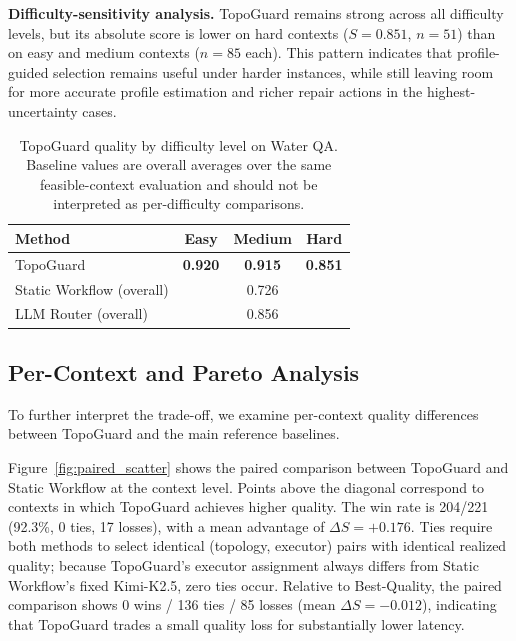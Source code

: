 \documentclass[acmsmall,review,anonymous]{acmart}
\begin{document}
\textbf{Difficulty-sensitivity analysis.} TopoGuard remains strong across all difficulty levels, but its absolute score is lower on hard contexts ($S=0.851$, $n=51$) than on easy and medium contexts ($n=85$ each). This pattern indicates that profile-guided selection remains useful under harder instances, while still leaving room for more accurate profile estimation and richer repair actions in the highest-uncertainty cases.

\begin{table}[t]
\centering
\caption{TopoGuard quality by difficulty level on Water QA. Baseline values are overall averages over the same feasible-context evaluation and should not be interpreted as per-difficulty comparisons.}
\label{tab:difficulty_breakdown}
\small
\begin{tabular}{lccc}
\toprule
\textbf{Method} & \textbf{Easy} & \textbf{Medium} & \textbf{Hard} \\
\midrule
TopoGuard        & \textbf{0.920} & \textbf{0.915} & \textbf{0.851} \\
Static Workflow (overall) & \multicolumn{3}{c}{0.726} \\
LLM Router (overall)       & \multicolumn{3}{c}{0.856} \\
\bottomrule
\end{tabular}
\end{table}



\subsection{Per-Context and Pareto Analysis}
\label{subsec:pareto_analysis}

To further interpret the trade-off, we examine per-context quality differences between TopoGuard and the main reference baselines.

Figure~\ref{fig:paired_scatter} shows the paired comparison between TopoGuard and Static Workflow at the context level. Points above the diagonal correspond to contexts in which TopoGuard achieves higher quality. The win rate is 204/221 (92.3\%, 0 ties, 17 losses), with a mean advantage of $\Delta S = +0.176$. Ties require both methods to select identical (topology, executor) pairs with identical realized quality; because TopoGuard's executor assignment always differs from Static Workflow's fixed Kimi-K2.5, zero ties occur. Relative to Best-Quality, the paired comparison shows 0 wins / 136 ties / 85 losses (mean $\Delta S = -0.012$), indicating that TopoGuard trades a small quality loss for substantially lower latency.
\end{document}

